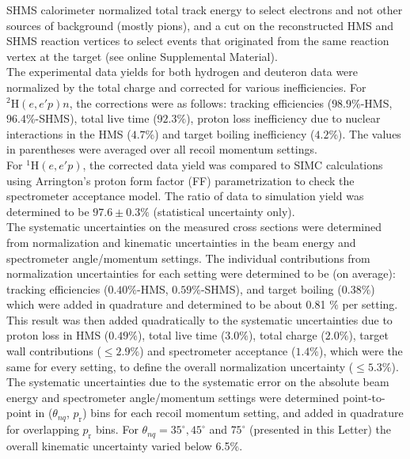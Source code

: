 \documentclass[aps,prl,twocolumn,showpacs,superscriptaddress,groupedaddress]{revtex4-2}  %
\begin{document}
SHMS calorimeter normalized total track energy to select electrons and not other sources of background (mostly pions), and a cut on the reconstructed HMS and SHMS reaction vertices to select events that 
originated from the same reaction vertex at the target (see online Supplemental Material). \\
\indent The experimental data yields for both hydrogen and deuteron data were normalized by the total charge and corrected for various inefficiencies. For $^{2}\mathrm{H}(e,e'p)n$, the corrections
were as follows\cite{cyero_phdthesis}: tracking efficiencies ($98.9 \%$-HMS, $96.4 \%$-SHMS), total live time ($92.3 \%$), proton loss inefficiency due to nuclear interactions in the HMS ($4.7 \%$) and
target boiling inefficiency ($4.2 \%$). The values in parentheses were averaged over all recoil momentum settings. \\
\indent For $^{1}\mathrm{H}(e,e'p)$, the corrected data yield was compared to SIMC calculations using Arrington's proton form factor (FF) parametrization \cite{PhysRevC.69.022201} to check the spectrometer acceptance
model. The ratio of data to simulation yield was determined to be $97.6\pm0.3 \%$ (statistical uncertainty only).\\
\indent The systematic uncertainties on the measured cross sections were determined from 
normalization and kinematic uncertainties in the beam energy and spectrometer angle/momentum settings. The individual
contributions from normalization uncertainties for each setting were determined to be (on average)\cite{cyero_phdthesis}: tracking efficiencies ($0.40 \%$-HMS, $0.59 \%$-SHMS),
and target boiling ($0.38 \%$) which were added in quadrature and determined to be about 0.81 $\%$ per setting. This result was then added quadratically to
the systematic uncertainties due to proton loss in HMS ($0.49 \%$), total live time ($3.0 \%$), total charge ($2.0\%$), target wall contributions ($\leq2.9\%$) and spectrometer acceptance ($1.4\%$),  which were the same for every setting,
to define the overall normalization uncertainty ($\leq5.3\%$).\\
\indent The systematic uncertainties due to the systematic error on the absolute beam energy and spectrometer angle/momentum settings were
determined point-to-point in ($\theta_{nq}$, $p_{\mathrm{r}}$) bins for each recoil momentum setting, and added in quadrature for overlapping $p_{\mathrm{r}}$ bins. 
For $\theta_{nq}= 35^{\circ}, 45^{\circ}$ and $75^{\circ}$ (presented in this Letter) the overall kinematic uncertainty varied below 6.5$\%$.
\end{document}
